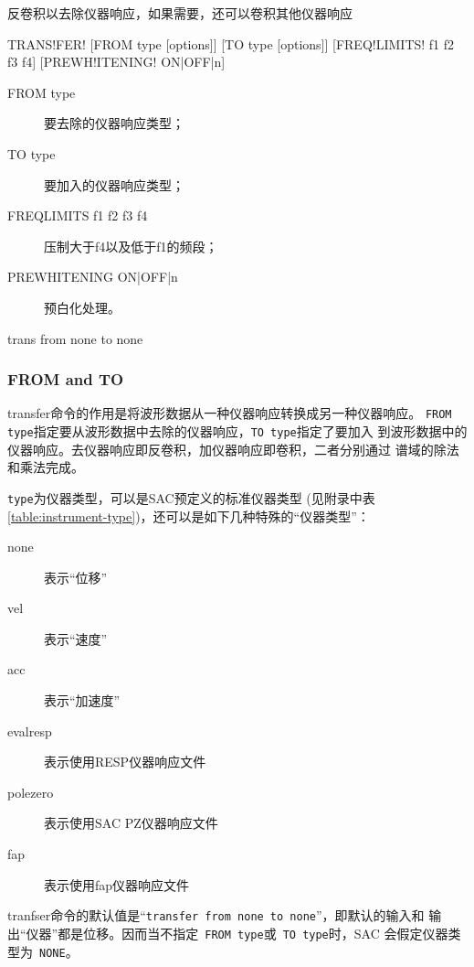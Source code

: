 \label{cmd:transfer}

反卷积以去除仪器响应，如果需要，还可以卷积其他仪器响应

\begin{SACSTX}
TRANS!FER! [FROM type [options]] [TO type [options]]
    [FREQ!LIMITS! f1 f2 f3 f4] [PREWH!ITENING! ON|OFF|n]
\end{SACSTX}

\begin{description}
\item [FROM type] 要去除的仪器响应类型；
\item [TO type] 要加入的仪器响应类型；
\item [FREQLIMITS f1 f2 f3 f4] 压制大于f4以及低于f1的频段；
\item [PREWHITENING ON|OFF|n] 预白化处理。
\end{description}

\begin{SACDFT}
trans from none to none
\end{SACDFT}

\subsubsection{FROM and TO}
transfer命令的作用是将波形数据从一种仪器响应转换成另一种仪器响应。
\verb+FROM type+指定要从波形数据中去除的仪器响应，\verb+TO type+指定了要加入
到波形数据中的仪器响应。去仪器响应即反卷积，加仪器响应即卷积，二者分别通过
谱域的除法和乘法完成。

\verb+type+为仪器类型，可以是SAC预定义的标准仪器类型
(见附录中表\ref{table:instrument-type})，还可以是如下几种特殊的``仪器类型''：
\begin{description}
\item [none] 表示``位移''
\item [vel] 表示``速度''
\item [acc] 表示``加速度''
\item [evalresp] 表示使用RESP仪器响应文件
\item [polezero] 表示使用SAC PZ仪器响应文件
\item [fap] 表示使用fap仪器响应文件
\end{description}

tranfser命令的默认值是``\verb+transfer from none to none+''，即默认的输入和
输出``仪器''都是位移。因而当不指定~\verb+FROM type+或~\verb+TO type+时，SAC
会假定仪器类型为~\verb+NONE+。


